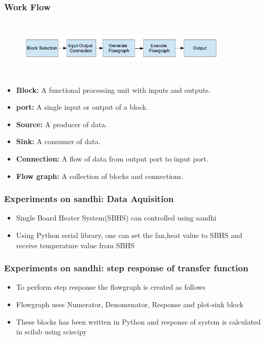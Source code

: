 \documentclass{beamer}
\begin{document}
\begin{frame}
\frametitle{Work Flow}
\vspace{-0.14in}
\begin{figure}
\centering
\includegraphics[height=2.8cm, width=10cm]{sandhi_presentation.png}
\end{figure}
\vspace{-0.2in}
\begin{itemize}
\item \textbf{Block:} A functional processing unit with inputs and outputs.
\item \textbf{port:} A single input or output of a block.
\item \textbf{Source:} A producer of data.
\item \textbf{Sink:} A consumer of data.
\item \textbf{Connection:} A flow of data from output port to input port.
\item \textbf{Flow graph:} A collection of blocks and connections.
\end{itemize}


\end{frame}\begin{frame}
        \frametitle{Experiments on sandhi: Data Aquisition}
        \begin{itemize}
	\item Single Board Heater System(SBHS) can controlled using sandhi
	\item Using Python serial library, one can set the fan,heat value to SBHS and receive temperature value from SBHS
        \end{itemize}

\end{frame}


\begin{frame}
        \frametitle{Experiments on sandhi: step response of transfer function}
        \begin{itemize}
	\item To perform step response the flowgraph is created as follows
	\item Flowgraph uses Numerator, Denomenator, Response and plot-sink block
	\item These blocks has been written in Python and response of system is calculated in scilab using sciscipy
        \end{itemize}
\end{frame}
\end{document}
